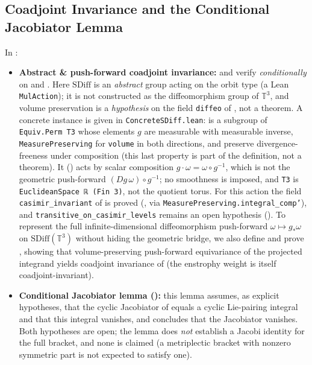 \documentclass[11pt,a4paper]{article}
\theoremstyle{plain}
\theoremstyle{definition}
\theoremstyle{remark}
\newcommand{\T}{\mathbb{T}^3}
\begin{document}
\subsection{Coadjoint Invariance and the Conditional Jacobiator Lemma}
In :
\begin{itemize}
\item \textbf{Abstract \& push-forward coadjoint invariance:}  and  verify  \emph{conditionally} on  and . Here $\mathrm{SDiff}$ is an \emph{abstract} group acting on the orbit type (a Lean \texttt{MulAction}); it is not constructed as the diffeomorphism group of $\T$, and volume preservation is a \emph{hypothesis} on the field \texttt{diffeo} of , not a theorem. A concrete instance is given in \texttt{ConcreteSDiff.lean}:  is a subgroup of \texttt{Equiv.Perm T3} whose elements $g$ are measurable with measurable inverse, \texttt{MeasurePreserving} for \texttt{volume} in both directions, and preserve divergence-freeness under composition (this last property is part of the definition, not a theorem). It () acts by scalar composition $g\cdot\omega=\omega\circ g^{-1}$, which is not the geometric push-forward $(Dg\,\omega)\circ g^{-1}$; no smoothness is imposed, and \texttt{T3} is \texttt{EuclideanSpace ℝ (Fin 3)}, not the quotient torus. For this action the field \texttt{casimir\_invariant} of  is proved (, via \texttt{MeasurePreserving.integral\_comp'}), and \texttt{transitive\_on\_casimir\_levels} remains an open hypothesis (). To represent the full infinite-dimensional diffeomorphism push-forward $\omega\mapsto g_*\omega$ on $\mathrm{SDiff}(\T)$ without hiding the geometric bridge, we also define  and prove , showing that volume-preserving push-forward equivariance of the projected integrand yields coadjoint invariance of  (the enstrophy weight is itself coadjoint-invariant).
\item \textbf{Conditional Jacobiator lemma ():} this lemma assumes, as explicit hypotheses, that the cyclic Jacobiator of  equals a cyclic Lie-pairing integral and that this integral vanishes, and concludes that the Jacobiator vanishes. Both hypotheses are open; the lemma does \emph{not} establish a Jacobi identity for the full bracket, and none is claimed (a metriplectic bracket with nonzero symmetric part is not expected to satisfy one).
\end{itemize}
\end{document}

